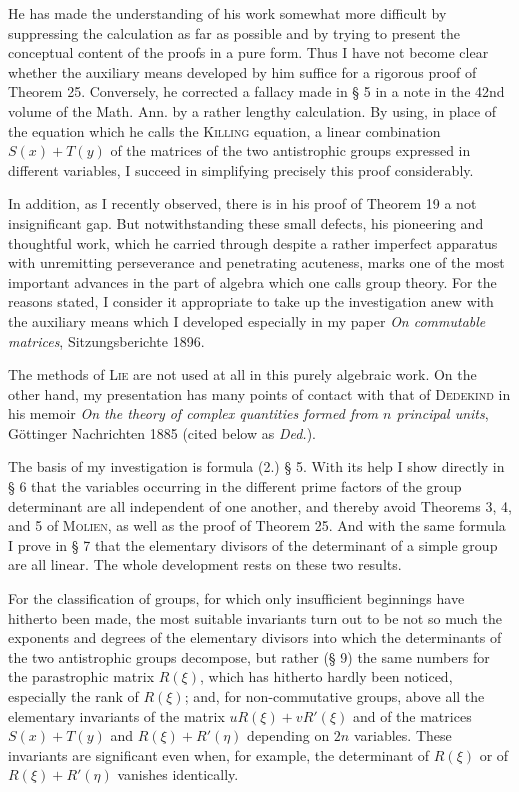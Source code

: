 \documentclass[11pt]{article}
\begin{document}
He has made the understanding of his work somewhat more difficult by suppressing the calculation as far as possible and by trying to present the conceptual content of the proofs in a pure form. Thus I have not become clear whether the auxiliary means developed by him suffice for a rigorous proof of Theorem 25. Conversely, he corrected a fallacy made in § 5 in a note in the 42nd volume of the Math. Ann. by a rather lengthy calculation. By using, in place of the equation which he calls the \textsc{Killing} equation, a linear combination $S(x)+T(y)$ of the matrices of the two antistrophic groups expressed in different variables, I succeed in simplifying precisely this proof considerably.

In addition, as I recently observed, there is in his proof of Theorem 19 a not insignificant gap. But notwithstanding these small defects, his pioneering and thoughtful work, which he carried through despite a rather imperfect apparatus with unremitting perseverance and penetrating acuteness, marks one of the most important advances in the part of algebra which one calls group theory. For the reasons stated, I consider it appropriate to take up the investigation anew with the auxiliary means which I developed especially in my paper \emph{On commutable matrices}, Sitzungsberichte 1896.

The methods of \textsc{Lie} are not used at all in this purely algebraic work. On the other hand, my presentation has many points of contact with that of \textsc{Dedekind} in his memoir \emph{On the theory of complex quantities formed from $n$ principal units}, Göttinger Nachrichten 1885 (cited below as \emph{Ded.}).

The basis of my investigation is formula (2.) § 5. With its help I show directly in § 6 that the variables occurring in the different prime factors of the group determinant are all independent of one another, and thereby avoid Theorems 3, 4, and 5 of \textsc{Molien}, as well as the proof of Theorem 25. And with the same formula I prove in § 7 that the elementary divisors of the determinant of a simple group are all linear. The whole development rests on these two results.

For the classification of groups, for which only insufficient beginnings have hitherto been made, the most suitable invariants turn out to be not so much the exponents and degrees of the elementary divisors into which the determinants of the two antistrophic groups decompose, but rather (§ 9) the same numbers for the parastrophic matrix $R(\xi)$, which has hitherto hardly been noticed, especially the rank of $R(\xi)$; and, for non-commutative groups, above all the elementary invariants of the matrix $uR(\xi)+vR'(\xi)$ and of the matrices $S(x)+T(y)$ and $R(\xi)+R'(\eta)$ depending on $2n$ variables. These invariants are significant even when, for example, the determinant of $R(\xi)$ or of $R(\xi)+R'(\eta)$ vanishes identically.
\end{document}
